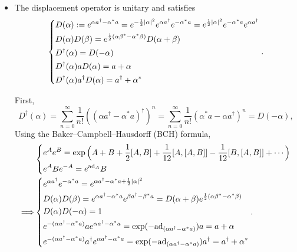 \documentclass[10pt, a4paper]{article}
\numberwithin{equation}{section}
\begin{document}
\begin{itemize}
		\item The displacement operator is unitary and satisfies
		\begin{equation}
			\begin{dcases}
				D(\alpha) := e^{\alpha a^\dag - \alpha^* a} = e^{- \frac{1}{2} |\alpha|^2} e^{\alpha a^\dag} e^{- \alpha^* a} = e^{\frac{1}{2} |\alpha|^2} e^{- \alpha^* a} e^{\alpha a^\dag} \\
				D(\alpha) D(\beta) = e^{\frac{1}{2} (\alpha \beta^* - \alpha^* \beta)} D(\alpha + \beta) \\
				D^\dag(\alpha) = D(- \alpha) \\
				D^\dag(\alpha) a D(\alpha) = a + \alpha \\
				D^\dag(\alpha) a^\dag D(\alpha) = a ^\dag + \alpha^*
			\end{dcases}.
		\end{equation}
		
		\begin{tcolorbox}[title=Calculation:]
			First,
			\begin{equation}
				D^\dag(\alpha) = \sum_{n = 0}^\infty \frac{1}{n!} ((\alpha a^\dag - \alpha^* a)^\dag)^n = \sum_{n = 0}^\infty \frac{1}{n!} (\alpha^* a - \alpha a^\dag)^n = D(- \alpha),
			\end{equation}
			Using the Baker--Campbell--Hausdorff (BCH) formula,
			\begin{align}
				& \begin{dcases}
					e^A e^B = \exp \Big( A + B + \frac{1}{2} [A, B] + \frac{1}{12} [A, [A, B]] - \frac{1}{12} [B, [A, B]] + \cdots \Big) \\
					e^A B e^{- A} = e^{\mathrm{ad}_A} B
				\end{dcases} \notag \\
				\Longrightarrow & \begin{dcases}
					e^{\alpha a^\dag} e^{- \alpha^* a} = e^{\alpha a^\dag - \alpha^* a + \frac{1}{2} |\alpha|^2} \\
					D(\alpha) D(\beta) = e^{\alpha a^\dag - \alpha^* a} e^{\beta a^\dag - \beta^* a} = D(\alpha + \beta) e^{\frac{1}{2} (\alpha \beta^* - \alpha^* \beta)} \\
					D(\alpha) D(- \alpha) = 1 \\
					e^{- (\alpha a^\dag - \alpha^* a)} a e^{\alpha a^\dag - \alpha^* a} = \exp(- \mathrm{ad}_{(\alpha a^\dag - \alpha^* a)}) a = a + \alpha \\
					e^{- (\alpha a^\dag - \alpha^* a)} a^\dag e^{\alpha a^\dag - \alpha^* a} = \exp(- \mathrm{ad}_{(\alpha a^\dag - \alpha^* a)}) a^\dag = a^\dag + \alpha^*
				\end{dcases}.
			\end{align}
		\end{tcolorbox}
		

\end{itemize}
\end{document}
